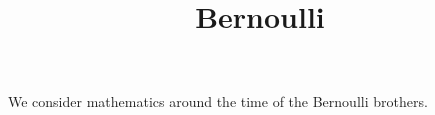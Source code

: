 \documentclass{ximera}
\title{Bernoulli}
\begin{document}
\begin{abstract}
\end{abstract}
\maketitle

We consider mathematics around the time of the Bernoulli brothers.
\end{document}
